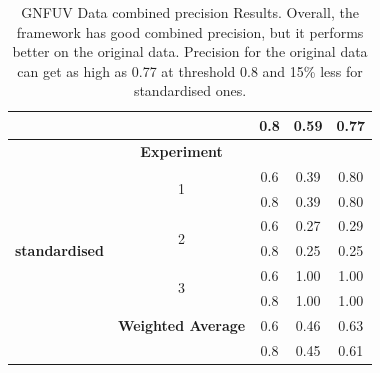 \documentclass{mpaper}
\begin{document}
\begin{table}[]
\begin{tabular}{|c|cccc|}
                            & \multicolumn{1}{c|}{}                          & \multicolumn{1}{c|}{0.8}                & 0.59             & 0.77              \\ \hline
                            & \multicolumn{1}{c|}{\textbf{Experiment}}       & \multicolumn{1}{c|}{}                   &                  &                   \\ \cline{2-5} 
                            & \multicolumn{1}{c|}{\multirow{2}{*}{1}}        & \multicolumn{1}{c|}{0.6}                & 0.39             & 0.80              \\
                            & \multicolumn{1}{c|}{}                          & \multicolumn{1}{c|}{0.8}                & 0.39             & 0.80              \\ \cline{2-5} 
                            & \multicolumn{1}{c|}{\multirow{2}{*}{2}}        & \multicolumn{1}{c|}{0.6}                & 0.27             & 0.29              \\
\textbf{standardised}       & \multicolumn{1}{c|}{}                          & \multicolumn{1}{c|}{0.8}                & 0.25             & 0.25              \\ \cline{2-5} 
                            & \multicolumn{1}{c|}{\multirow{2}{*}{3}}        & \multicolumn{1}{c|}{0.6}                & 1.00             & 1.00              \\
                            & \multicolumn{1}{c|}{}                          & \multicolumn{1}{c|}{0.8}                & 1.00             & 1.00              \\ \cline{2-5} 
                            & \multicolumn{1}{c|}{\textbf{Weighted Average}} & \multicolumn{1}{c|}{0.6}                & 0.46             & 0.63              \\
                            & \multicolumn{1}{c|}{}                          & \multicolumn{1}{c|}{0.8}                & 0.45             & 0.61              \\ \hline
\end{tabular}
\caption{\label{tab:gnfuv_combined_preicision_results} GNFUV Data combined precision Results. Overall, the framework has good combined precision, but it performs better on the original data. Precision for the original data can get as high as 0.77 at threshold 0.8 and 15\% less for standardised ones.}
\end{table}
\end{document}
